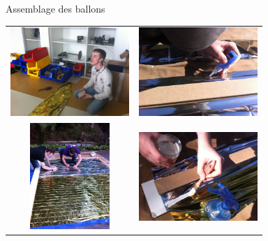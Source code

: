 \begin{frame}{Assemblage des ballons}
  \begin{center}
	\begin{tabular}{cc}
		\includegraphics[width=4.5cm]{../Images/assen_0.JPG} &
		\includegraphics[width=4.5cm]{../Images/assen_1.JPG} \\
		\includegraphics[width=3cm]{../Images/assen_2.JPG} &
		\includegraphics[width=4.5cm]{../Images/assen_3.JPG} \\
	\end{tabular}
  \end{center}
\end{frame}


